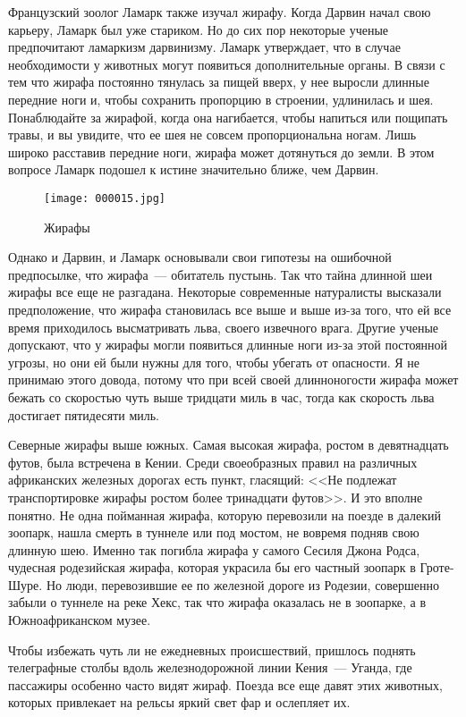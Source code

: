 \documentclass[12pt,a4paper,twoside,openany,svgnames]{memoir}
\begin{document}
Французский зоолог Ламарк также изучал жирафу. Когда Дарвин начал свою карьеру, Ламарк был уже стариком. Но до сих пор некоторые ученые предпочитают ламаркизм дарвинизму. Ламарк утверждает, что в случае необходимости у животных могут появиться дополнительные органы. В связи с тем что жирафа постоянно тянулась за пищей вверх, у нее выросли длинные передние ноги и, чтобы сохранить пропорцию в строении, удлинилась и шея. Понаблюдайте за жирафой, когда она нагибается, чтобы напиться или пощипать травы, и вы увидите, что ее шея не совсем пропорциональна ногам. Лишь широко расставив передние ноги, жирафа может дотянуться до земли. В этом вопросе Ламарк подошел к истине значительно ближе, чем Дарвин.

\begin{figure}[ht!]
\centering
\texttt{[image: 000015.jpg]}
\caption{Жирафы}
\label{overflow}
\end{figure}


Однако и Дарвин, и Ламарк основывали свои гипотезы на ошибочной предпосылке, что жирафа~--- обитатель пустынь. Так что тайна длинной шеи жирафы все еще не разгадана. Некоторые современные натуралисты высказали предположение, что жирафа становилась все выше и выше из-за того, что ей все время приходилось высматривать льва, своего извечного врага. Другие ученые допускают, что у жирафы могли появиться длинные ноги из-за этой постоянной угрозы, но они ей были нужны для того, чтобы убегать от опасности. Я не принимаю этого довода, потому что при всей своей длинноногости жирафа может бежать со скоростью чуть выше тридцати миль в час, тогда как скорость льва достигает пятидесяти миль.

Северные жирафы выше южных. Самая высокая жирафа, ростом в девятнадцать футов, была встречена в Кении. Среди своеобразных правил на различных африканских железных дорогах есть пункт, гласящий: <<Не подлежат транспортировке жирафы ростом более тринадцати футов>>. И это вполне понятно. Не одна пойманная жирафа, которую перевозили на поезде в далекий зоопарк, нашла смерть в туннеле или под мостом, не вовремя подняв свою длинную шею. Именно так погибла жирафа у самого Сесиля Джона Родса, чудесная родезийская жирафа, которая украсила бы его частный зоопарк в Гроте-Шуре. Но люди, перевозившие ее по железной дороге из Родезии, совершенно забыли о туннеле на реке Хекс, так что жирафа оказалась не в зоопарке, а в Южноафриканском музее.

Чтобы избежать чуть ли не ежедневных происшествий, пришлось поднять телеграфные столбы вдоль железнодорожной линии Кения~--- Уганда, где пассажиры особенно часто видят жираф. Поезда все еще давят этих животных, которых привлекает на рельсы яркий свет фар и ослепляет их.
\end{document}
